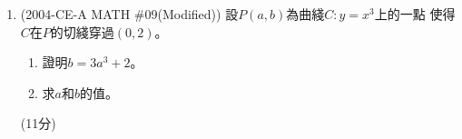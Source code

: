 \documentclass[12pt]{article}
\begin{document}
\begin{enumerate}
            \hrulefill
            
            \hrulefill
            
            \hrulefill
            
            \hrulefill
            
            \hrulefill
            
            \hrulefill
            
            \hrulefill
            
            \hrulefill
            
            \hrulefill
            
            \hrulefill
            
            \hrulefill

            \hrulefill
            
            \hrulefill
            
            \hrulefill
            
            \hrulefill
            
            \hrulefill
            
            \hrulefill
            
            \hrulefill
            
            \hrulefill
            
            \hrulefill
            
            \hrulefill

        \pagebreak
        \item (2004-CE-A MATH \#09(Modified)) 設$P(a,b)$為曲綫$C:y=x^3$上的一點 使得$C$在$P$的切綫穿過$(0,2)$。 \begin{enumerate}
            \item 證明$b=3a^3+2$。
            \item 求$a$和$b$的值。
        \end{enumerate}\hfill(11分)
            
            \hrulefill
            
            \hrulefill
            
            \hrulefill
            
            \hrulefill
            
            \hrulefill
            
            \hrulefill
            
            \hrulefill
            

\end{enumerate}
\end{document}
